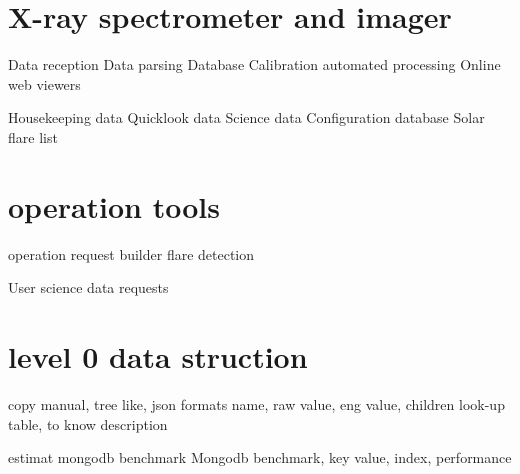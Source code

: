 \documentclass[preprint,11pt]{elsarticle}
\begin{document}
\section{X-ray spectrometer and imager}

Data reception
Data parsing 
Database
Calibration automated processing
Online web viewers

Housekeeping data 
Quicklook data
Science data
Configuration database
Solar flare list
\section{operation tools}
operation request builder
flare detection


User science data requests
\section{level 0 data struction}
copy manual,
tree like, 
json formats
name, raw value, eng value, children
look-up table, to know description

estimat mongodb benchmark
Mongodb benchmark,
key value, index, performance
\end{document}
